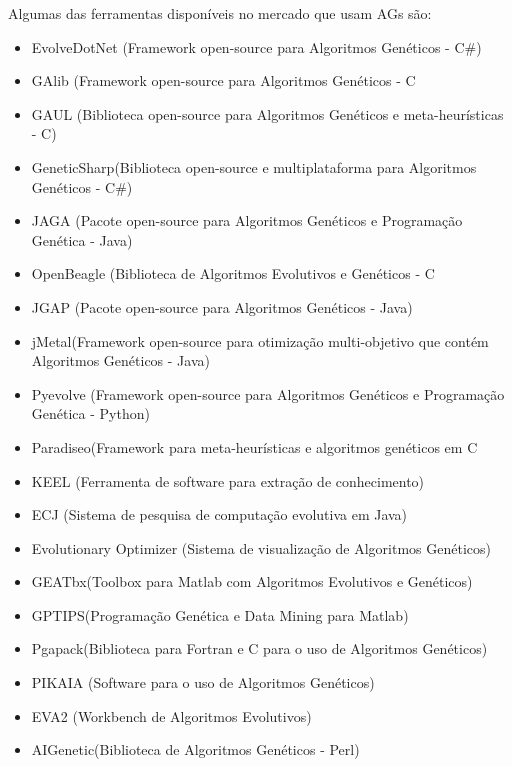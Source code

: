 Algumas das ferramentas disponíveis no mercado que usam AGs são:
\begin{itemize}
\item EvolveDotNet (Framework open-source para Algoritmos Genéticos - C\#)

\item GAlib (Framework open-source para Algoritmos Genéticos - C

\item GAUL (Biblioteca open-source para Algoritmos Genéticos e meta-heurísticas - C)

\item GeneticSharp(Biblioteca open-source e multiplataforma para Algoritmos Genéticos - C\#)

\item JAGA (Pacote open-source para Algoritmos Genéticos e Programação Genética - Java)

\item OpenBeagle (Biblioteca de Algoritmos Evolutivos e Genéticos - C

\item JGAP (Pacote open-source para Algoritmos Genéticos - Java)

\item jMetal(Framework open-source para otimização multi-objetivo que contém Algoritmos 
Genéticos - Java)

\item Pyevolve (Framework open-source para Algoritmos Genéticos e Programação Genética - Python)

\item Paradiseo(Framework para meta-heurísticas e algoritmos genéticos em C

\item KEEL (Ferramenta de software para extração de conhecimento)

\item ECJ (Sistema de pesquisa de computação evolutiva em Java)

\item Evolutionary Optimizer (Sistema de visualização de Algoritmos Genéticos)

\item GEATbx(Toolbox para Matlab com Algoritmos Evolutivos e Genéticos)

\item GPTIPS(Programação Genética e Data Mining para Matlab)

\item Pgapack(Biblioteca para Fortran e C para o uso de Algoritmos Genéticos)

\item PIKAIA (Software para o uso de Algoritmos Genéticos)

\item EVA2 (Workbench de Algoritmos Evolutivos)

\item AIGenetic(Biblioteca de Algoritmos Genéticos - Perl)
\end{itemize}